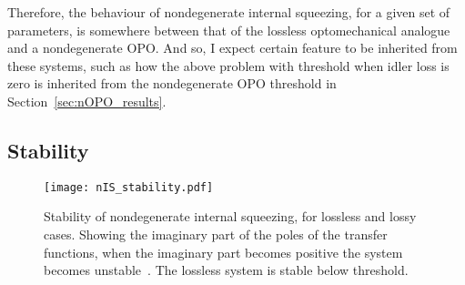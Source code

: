 Therefore, the behaviour of nondegenerate internal squeezing, for a given set of parameters, is somewhere between that of the lossless optomechanical analogue and a nondegenerate OPO. And so, I expect certain feature to be inherited from these systems, such as how the above problem with threshold when idler loss is zero is inherited from the nondegenerate OPO threshold in Section~\ref{sec:nOPO_results}.


\subsection{Stability}

\begin{figure}
	\centering
	\texttt{[image: nIS\_stability.pdf]}
	\caption{  Stability of nondegenerate internal squeezing, for lossless and lossy cases. Showing the imaginary part of the poles of the transfer functions, when the imaginary part becomes positive the system becomes unstable~\cite{}. The lossless system is stable below threshold. }
	\label{fig:nIS_stability}
\end{figure}

